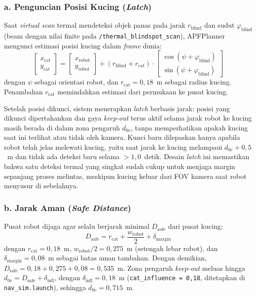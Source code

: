 \subsubsection*{a. Penguncian Posisi Kucing (\textit{Latch})}

Saat \textit{virtual scan} termal mendeteksi objek panas pada jarak $r_\text{blind}$ dan sudut $\varphi_\text{blind}$ (beam dengan nilai finite pada \texttt{/thermal\_blindspot\_scan}), APFPlanner mengunci estimasi posisi kucing dalam \textit{frame} dunia:
\begin{equation}
    \begin{bmatrix} x_\text{cat} \\ y_\text{cat} \end{bmatrix} =
    \begin{bmatrix} x_\text{robot} \\ y_\text{robot} \end{bmatrix} +
    (r_\text{blind} + r_\text{cat}) \cdot
    \begin{bmatrix} \cos(\psi + \varphi_\text{blind}) \\
                    \sin(\psi + \varphi_\text{blind}) \end{bmatrix}
    \label{eq:cat_world}
\end{equation}
dengan $\psi$ sebagai orientasi robot, dan $r_\text{cat} = 0{,}18$~m sebagai radius kucing. Penambahan $r_\text{cat}$ memindahkan estimasi dari permukaan ke pusat kucing.

Setelah posisi dikunci, sistem menerapkan \textit{latch} berbasis jarak: posisi yang dikunci dipertahankan dan gaya \textit{keep-out} terus aktif selama jarak robot ke kucing masih berada di dalam zona pengaruh $d_{0c}$, tanpa memperhatikan apakah kucing saat ini terlihat atau tidak oleh kamera. Kunci baru dilepaskan hanya apabila robot telah jelas melewati kucing, yaitu saat jarak ke kucing melampaui $d_{0c} + 0{,}5$~m dan tidak ada deteksi baru selama $> 1{,}0$~detik. Desain \textit{latch} ini memastikan bahwa satu deteksi termal yang singkat sudah cukup untuk menjaga margin sepanjang proses melintas, meskipun kucing keluar dari FOV kamera saat robot menyusur di sebelahnya.

\subsubsection*{b. Jarak Aman (\textit{Safe Distance})}

Pusat robot dijaga agar selalu berjarak minimal $D_\text{safe}$ dari pusat kucing:
\begin{equation}
    D_\text{safe} = r_\text{cat} + \frac{w_\text{robot}}{2} + \delta_\text{margin}
    \label{eq:d_safe}
\end{equation}
dengan $r_\text{cat} = 0{,}18$~m, $w_\text{robot}/2 = 0{,}275$~m (setengah lebar robot), dan $\delta_\text{margin} = 0{,}08$~m sebagai batas aman tambahan. Dengan demikian, $D_\text{safe} = 0{,}18 + 0{,}275 + 0{,}08 = 0{,}535$~m. Zona pengaruh \textit{keep-out} meluas hingga $d_{0c} = D_\text{safe} + \delta_\text{infl}$, dengan $\delta_\text{infl} = 0{,}18$~m (\texttt{cat\_influence = 0,18}, ditetapkan di \texttt{nav\_sim.launch}), sehingga $d_{0c} = 0{,}715$~m.

